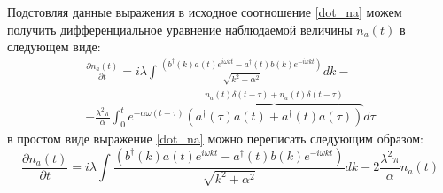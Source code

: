 Подстовляя данные выражения в исходное соотношение \eqref{dot_na} можем получить дифференциальное уравнение наблюдаемой величины $n_a(t)$ в следующем виде:
\begin{multline}
    \frac{\partial n_{a}(t)}{\partial t} =
    i \lambda \int \frac{(b^{\dagger}(k) a(t) e^{i \omega k t} - a^{\dagger}(t) b(k)e^{-i \omega k t})}{\sqrt{k^{2} + \alpha^2}} dk - \\
    - \frac{\lambda^{2} \pi}{\alpha} \int_{0}^{t} e^{- \alpha \omega (t - \tau)} \overbrace{(a^{\dagger}(\tau) a(t) + a^{\dagger}(t) a(\tau))}^{n_{a}(t) \delta(t-\tau) + n_{a}(t) \delta(t-\tau)} d\tau
\end{multline}
в простом виде выражение \eqref{dot_na} можно переписать следующим образом:
\begin{equation}\label{na}
    \frac{\partial n_{a}(t)}{\partial t} =
    i \lambda \int \frac{(b^{\dagger}(k) a(t) e^{i \omega k t} - a^{\dagger}(t) b(k) e^{-i \omega k t})}{\sqrt{k^{2} + \alpha^2}} dk
    - 2 \frac{\lambda^{2} \pi}{\alpha} n_{a}(t)
\end{equation}

